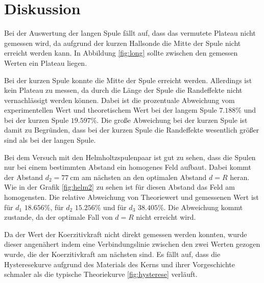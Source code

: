 \section{Diskussion}
\label{sec:Diskussion}

Bei der Auswertung der langen Spule fällt auf, dass das vermutete Plateau nicht gemessen wird, da aufgrund der kurzen Hallsonde die Mitte der Spule nicht erreicht werden kann.
In Abbildung \ref{fig:long} sollte zwischen den gemessen Werten ein Plateau liegen.

Bei der kurzen Spule konnte die Mitte der Spule erreicht werden. 
Allerdings ist kein Plateau zu messen, da durch die Länge der Spule die Randeffekte nicht vernachlässigt werden können.
Dabei ist die prozentuale Abweichung vom experimentellen Wert und theoretischem Wert bei der langem Spule $7.188\%$ und bei der kurzen Spule $19.597\%$.
Die große Abweichung bei der kurzen Spule ist damit zu Begründen, dass bei der kurzen Spule die Randeffekte wesentlich größer sind als bei der langen Spule.

Bei dem Versuch mit den Helmholtzspulenpaar ist gut zu sehen, dass die Spulen nur bei einem bestimmten Abstand ein homogenes Feld aufbaut.
Dabei kommt der Abstand $d_2=7\SI{7}{\centi\meter}$ am nächsten an den optimalen Abstand $d=R$ heran. Wie in der Grafik \ref{fig:helm2} zu sehen ist für diesen Abstand das Feld am homogensten.
Die relative Abweichung von Theoriewert und gemessenen Wert ist für $d_1$ $18.656\%$, für $d_2$ $15.256 \%$ und für $d_3$ $38.405 \%$.
Die Abweichung kommt zustande, da der optimale Fall von $d=R$ nicht erreicht wird.

Da der Wert der Koerzitivkraft nicht direkt gemessen werden konnten, wurde dieser angenähert indem eine Verbindungslinie zwischen den zwei Werten gezogen wurde, die der Koerzitivkraft am nächsten sind.
Es fällt auf, dass die Hysteresekurve aufgrund des Materials des Kerns und ihrer Vorgeschichte schmaler als die typische Theoriekurve \ref{fig:hysterese} verläuft.